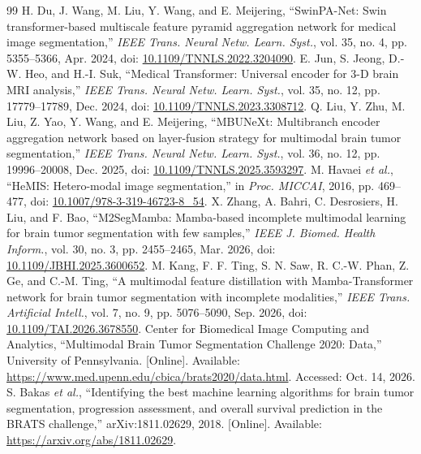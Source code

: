 \documentclass[conference]{IEEEtran}
\begin{document}
\begin{thebibliography}{99}
 H. Du, J. Wang, M. Liu, Y. Wang, and E. Meijering, ``SwinPA-Net: Swin transformer-based multiscale feature pyramid aggregation network for medical image segmentation,'' \emph{IEEE Trans. Neural Netw. Learn. Syst.}, vol. 35, no. 4, pp. 5355--5366, Apr. 2024, doi: \url{10.1109/TNNLS.2022.3204090}.
 E. Jun, S. Jeong, D.-W. Heo, and H.-I. Suk, ``Medical Transformer: Universal encoder for 3-D brain MRI analysis,'' \emph{IEEE Trans. Neural Netw. Learn. Syst.}, vol. 35, no. 12, pp. 17779--17789, Dec. 2024, doi: \url{10.1109/TNNLS.2023.3308712}.
 Q. Liu, Y. Zhu, M. Liu, Z. Yao, Y. Wang, and E. Meijering, ``MBUNeXt: Multibranch encoder aggregation network based on layer-fusion strategy for multimodal brain tumor segmentation,'' \emph{IEEE Trans. Neural Netw. Learn. Syst.}, vol. 36, no. 12, pp. 19996--20008, Dec. 2025, doi: \url{10.1109/TNNLS.2025.3593297}.
 M. Havaei \emph{et al.}, ``HeMIS: Hetero-modal image segmentation,'' in \emph{Proc. MICCAI}, 2016, pp. 469--477, doi: \url{10.1007/978-3-319-46723-8_54}.
 X. Zhang, A. Bahri, C. Desrosiers, H. Liu, and F. Bao, ``M2SegMamba: Mamba-based incomplete multimodal learning for brain tumor segmentation with few samples,'' \emph{IEEE J. Biomed. Health Inform.}, vol. 30, no. 3, pp. 2455--2465, Mar. 2026, doi: \url{10.1109/JBHI.2025.3600652}.
 M. Kang, F. F. Ting, S. N. Saw, R. C.-W. Phan, Z. Ge, and C.-M. Ting, ``A multimodal feature distillation with Mamba-Transformer network for brain tumor segmentation with incomplete modalities,'' \emph{IEEE Trans. Artificial Intell.}, vol. 7, no. 9, pp. 5076--5090, Sep. 2026, doi: \url{10.1109/TAI.2026.3678550}.
 Center for Biomedical Image Computing and Analytics, ``Multimodal Brain Tumor Segmentation Challenge 2020: Data,'' University of Pennsylvania. [Online]. Available: \url{https://www.med.upenn.edu/cbica/brats2020/data.html}. Accessed: Oct. 14, 2026.
 S. Bakas \emph{et al.}, ``Identifying the best machine learning algorithms for brain tumor segmentation, progression assessment, and overall survival prediction in the BRATS challenge,'' arXiv:1811.02629, 2018. [Online]. Available: \url{https://arxiv.org/abs/1811.02629}.
\end{thebibliography}
\end{document}
